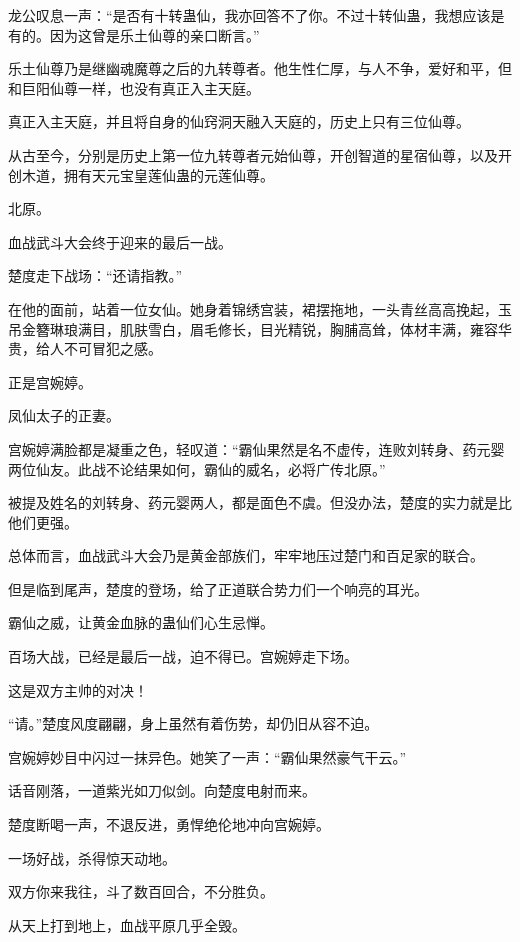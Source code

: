 
\begin{this_body}

龙公叹息一声：“是否有十转蛊仙，我亦回答不了你。不过十转仙蛊，我想应该是有的。因为这曾是乐土仙尊的亲口断言。”

乐土仙尊乃是继幽魂魔尊之后的九转尊者。他生性仁厚，与人不争，爱好和平，但和巨阳仙尊一样，也没有真正入主天庭。

真正入主天庭，并且将自身的仙窍洞天融入天庭的，历史上只有三位仙尊。

从古至今，分别是历史上第一位九转尊者元始仙尊，开创智道的星宿仙尊，以及开创木道，拥有天元宝皇莲仙蛊的元莲仙尊。

北原。

血战武斗大会终于迎来的最后一战。

楚度走下战场：“还请指教。”

在他的面前，站着一位女仙。她身着锦绣宫装，裙摆拖地，一头青丝高高挽起，玉吊金簪琳琅满目，肌肤雪白，眉毛修长，目光精锐，胸脯高耸，体材丰满，雍容华贵，给人不可冒犯之感。

正是宫婉婷。

凤仙太子的正妻。

宫婉婷满脸都是凝重之色，轻叹道：“霸仙果然是名不虚传，连败刘转身、药元婴两位仙友。此战不论结果如何，霸仙的威名，必将广传北原。”

被提及姓名的刘转身、药元婴两人，都是面色不虞。但没办法，楚度的实力就是比他们更强。

总体而言，血战武斗大会乃是黄金部族们，牢牢地压过楚门和百足家的联合。

但是临到尾声，楚度的登场，给了正道联合势力们一个响亮的耳光。

霸仙之威，让黄金血脉的蛊仙们心生忌惮。

百场大战，已经是最后一战，迫不得已。宫婉婷走下场。

这是双方主帅的对决！

“请。”楚度风度翩翩，身上虽然有着伤势，却仍旧从容不迫。

宫婉婷妙目中闪过一抹异色。她笑了一声：“霸仙果然豪气干云。”

话音刚落，一道紫光如刀似剑。向楚度电射而来。

楚度断喝一声，不退反进，勇悍绝伦地冲向宫婉婷。

一场好战，杀得惊天动地。

双方你来我往，斗了数百回合，不分胜负。

从天上打到地上，血战平原几乎全毁。


\end{this_body}
